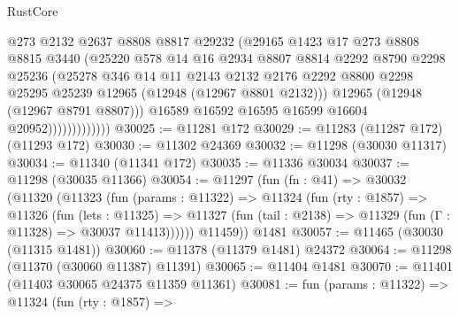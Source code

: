 \begin{lexlean}{RustCore}
\begin{coremodule}
                            @273
                            @2132
                            @2637
                            @8808
                            @8817
                            @29232
                            (@29165
                              @1423
                              @17
                              @273
                              @8808
                              @8815
                              @3440
                              (@25220
                                @578
                                @14
                                @16
                                @2934
                                @8807
                                @8814
                                @2292
                                @8790
                                @2298
                                @25236
                                (@25278
                                  @346
                                  @14
                                  @11
                                  @2143
                                  @2132
                                  @2176
                                  @2292
                                  @8800
                                  @2298
                                  @25295
                                  @25239
                                  @12965
                                  (@12948 (@12967 @8801 @2132)))
                                @12965
                                (@12948 (@12967 @8791 @8807)))
                              @16589
                              @16592
                              @16595
                              @16599
                              @16604
                              @20952)))))))))))))
@30025 := @11281 @172
@30029 := @11283 (@11287 @172) (@11293 @172)
@30030 := @11302 @24369
@30032 := @11298 (@30030 @11317)
@30034 := @11340 (@11341 @172)
@30035 := @11336 @30034
@30037 := @11298 (@30035 @11366)
@30054 := @11297
    (fun (fn : @41) =>
    @30032
      (@11320
        (@11323
          (fun (params : @11322) =>
          @11324
            (fun (rty : @1857) =>
            @11326
              (fun (lets : @11325) =>
              @11327 (fun (tail : @2138) => @11329 (fun (Γ : @11328) => @30037 @11413))))))
        @11459))
    @1481
@30057 := @11465 (@30030 (@11315 @1481))
@30060 := @11378 (@11379 @1481) @24372
@30064 := @11298 (@11370 (@30060 @11387) @11391)
@30065 := @11404 @1481
@30070 := @11401 (@11403 @30065 @24375 @11359 @11361)
@30081 := fun (params : @11322) =>
  @11324
    (fun (rty : @1857) =>

\end{coremodule}
\end{lexlean}
